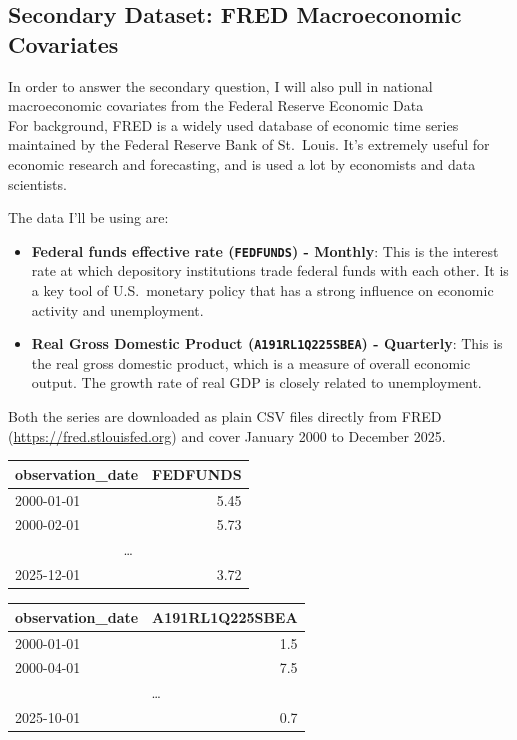 \documentclass[11pt]{article}
\begin{document}
\medskip
\subsection{Secondary Dataset: FRED Macroeconomic Covariates}
In order to answer the secondary question, I will also pull in national macroeconomic covariates from the Federal Reserve Economic Data \\ 

For background, FRED is a widely used database of economic time series maintained by the Federal Reserve Bank of St.\ Louis. 
It's extremely useful for economic research and forecasting, and is used a lot by economists and data scientists. 

The data I'll be using are:
\begin{itemize}[noitemsep]
  \item \textbf{Federal funds effective rate (\texttt{FEDFUNDS}) - Monthly}: This is the interest rate at which depository institutions trade federal funds with each other. It is a key tool of U.S.\ monetary policy that has a strong influence on economic activity and unemployment.
  \item \textbf{Real Gross Domestic Product (\texttt{A191RL1Q225SBEA}) - Quarterly}: This is the real gross domestic product, which is a measure of overall economic output. The growth rate of real GDP is closely related to unemployment.
\end{itemize}

\medskip
\noindent Both the series are downloaded as plain CSV files directly from FRED 
(\url{https://fred.stlouisfed.org}) and cover January 2000 to December 2025.

\medskip

\begin{center}
\small
\begin{tabular}{lr}
  \toprule
  \textbf{observation\_date} & \textbf{FEDFUNDS} \\
  \midrule
  2000-01-01 & 5.45 \\
  2000-02-01 & 5.73 \\
  \multicolumn{2}{c}{\ldots} \\
  2025-12-01 & 3.72 \\
  \bottomrule
\end{tabular}
\hspace{1.5em}
\begin{tabular}{lr}
  \toprule
  \textbf{observation\_date} & \textbf{A191RL1Q225SBEA} \\
  \midrule
  2000-01-01 & 1.5 \\
  2000-04-01 & 7.5 \\
  \multicolumn{2}{c}{\ldots} \\
  2025-10-01 & 0.7 \\
  \bottomrule
\end{tabular}
\end{center}
\end{document}
